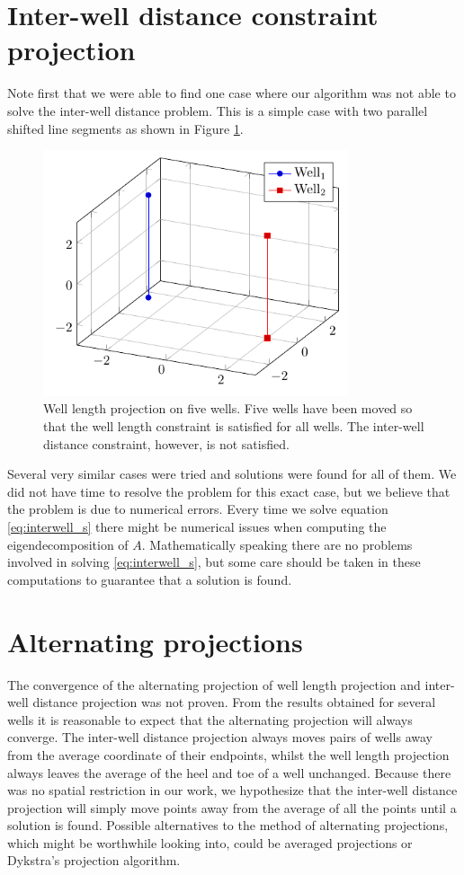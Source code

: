 \section{Inter-well distance constraint projection}
%
Note first that we were able to find one
case where our algorithm was not able to
solve the inter-well distance problem. This
is a simple case with two parallel shifted
line segments as shown in Figure \ref{fig:inter_well}.
%
\begin{figure}[H]
	\centering
	\includegraphics[width=0.80\textwidth]{figures/further_work/inter_well_distance.pdf}
	\caption{Well length projection on five wells. Five wells have been moved so that the well
										length constraint is satisfied for all wells.
										The inter-well distance constraint, however, is
										not satisfied.}
	\label{fig:inter_well}
\end{figure}
%
Several very similar cases were tried and
solutions were found for all of them. We
did not have time to resolve the problem
for this exact case, but we believe that 
the problem is due to numerical errors.
%
Every time we solve equation \eqref{eq:interwell_s}
there might be numerical issues when
computing the eigendecomposition of $A$.
Mathematically speaking there are no problems
involved in solving \eqref{eq:interwell_s}, but 
some care should be taken in these computations
to guarantee that a solution is found.
%
%
\section{Alternating projections}
%
The convergence of the alternating projection of well length
projection and inter-well distance projection was not proven.
From the results obtained for several wells it is reasonable 
to expect that the alternating projection will always converge.
The inter-well distance projection always moves pairs of wells
away from the average coordinate of their endpoints, whilst the
well length projection always leaves the average of the heel
and toe of a well unchanged. Because there was no spatial
restriction in our work, we hypothesize that the inter-well
distance projection will simply move points away from the
average of all the points until a solution is found.
Possible alternatives to the method of alternating projections, 
which might be worthwhile looking into, could be averaged 
projections \cite{Lewis_Luke_Malick_2} or Dykstra's projection
algorithm.
%